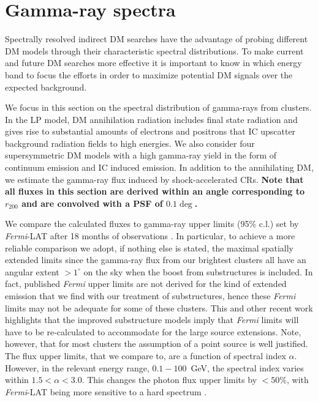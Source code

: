 \documentclass[10pt,aps,pra,reprint,amsmath,amsfonts,amssymb,showpacs,nofootinbib,floatfix]{revtex4-1}
\def\C#1{{\bf #1}}
\newcommand{\Fermi}{{\em Fermi}\xspace}
\newcommand{\rvir}{r_{200}}
\begin{document}
\section{Gamma-ray spectra}
\label{sect:spectral}
Spectrally resolved indirect DM searches have the advantage of probing
different DM models through their characteristic spectral
distributions. To make current and future DM searches more effective
it is important to know in which energy band to focus the efforts in
order to maximize potential DM signals over the expected background.

We focus in this section on the spectral distribution of gamma-rays
from clusters. In the LP model, DM annihilation radiation includes
final state radiation and gives rise to substantial amounts of
electrons and positrons that IC upscatter background radiation fields
to high energies. We also consider four supersymmetric DM models with
a high gamma-ray yield in the form of continuum emission and IC
induced emission. In addition to the annihilating DM, we estimate the
gamma-ray flux induced by shock-accelerated CRs. \C{Note that all
  fluxes in this section are derived within an angle corresponding to
  $\rvir$ and are convolved with a PSF of $0.1\deg$.}

We compare the calculated fluxes to gamma-ray upper limits (95\% c.l.)
set by \Fermi-LAT after 18 months of observations
\cite{2010ApJ...717L..71A}. In particular, to achieve a more reliable
comparison we adopt, if nothing else is stated, the maximal spatially
extended limits since the gamma-ray flux from our brightest clusters
all have an angular extent $>1^\circ$ on the sky when the boost from
substructures is included. In fact, published \Fermi upper limits are
not derived for the kind of extended emission that we find with our
treatment of substructures, hence these \Fermi limits may not be
adequate for some of these clusters. This and other recent work
highlights that the improved substructure models imply that \Fermi
limits will have to be re-calculated to accommodate for the large
source extensions. Note, however, that for most clusters the
assumption of a point source is well justified. The flux upper
limits, that we compare to, are a function of spectral index
$\alpha$. However, in the relevant energy range, $0.1-100$~GeV, the
spectral index varies within $1.5 < \alpha < 3.0$. This changes the
photon flux upper limits by $<50\%$, with \Fermi-LAT being more
sensitive to a hard spectrum \cite{2010ApJ...717L..71A}.
\end{document}
